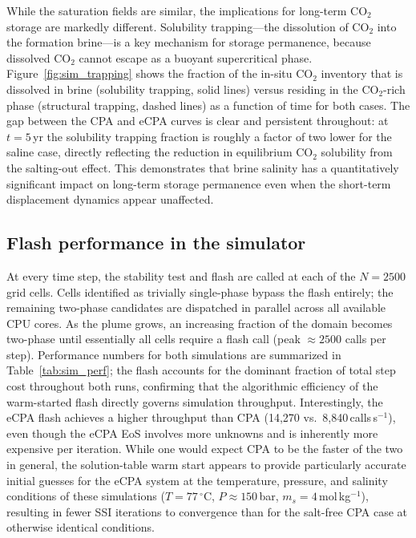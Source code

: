 \documentclass[preprint,12pt,number]{elsarticle}
\begin{document}
While the saturation fields are similar, the implications for long-term CO$_2$ storage
are markedly different.
Solubility trapping---the dissolution of CO$_2$ into the formation brine---is a key
mechanism for storage permanence, because dissolved CO$_2$ cannot escape as a
buoyant supercritical phase.
Figure~\ref{fig:sim_trapping} shows the fraction of the in-situ CO$_2$ inventory that
is dissolved in brine (solubility trapping, solid lines) versus residing in the
CO$_2$-rich phase (structural trapping, dashed lines) as a function of time for both
cases.
The gap between the CPA and eCPA curves is clear and persistent throughout: at $t = 5$\,yr
the solubility trapping fraction is roughly a factor of two lower for the saline case,
directly reflecting the reduction in equilibrium CO$_2$ solubility from the salting-out
effect.
This demonstrates that brine salinity has a quantitatively significant impact on
long-term storage permanence even when the short-term displacement dynamics appear
unaffected.

\subsection*{Flash performance in the simulator}

At every time step, the stability test and flash are called at each of the $N = 2500$
grid cells.
Cells identified as trivially single-phase bypass the flash entirely; the remaining
two-phase candidates are dispatched in parallel across all available CPU cores.
As the plume grows, an increasing fraction of the domain becomes two-phase until
essentially all cells require a flash call (peak ${\approx}2500$ calls per step).
Performance numbers for both simulations are summarized in Table~\ref{tab:sim_perf};
the flash accounts for the dominant fraction of total step cost throughout both runs,
confirming that the algorithmic efficiency of the warm-started flash directly governs
simulation throughput.
Interestingly, the eCPA flash achieves a higher throughput than CPA (14{,}270 vs.\
8{,}840\,calls\,s$^{-1}$), even though the eCPA EoS involves more unknowns and is
inherently more expensive per iteration.
While one would expect CPA to be the faster of the two in general, the solution-table
warm start appears to provide particularly accurate initial guesses for the eCPA system
at the temperature, pressure, and salinity conditions of these simulations
($T = 77\,^\circ$C, $P \approx 150$\,bar, $m_s = 4$\,mol\,kg$^{-1}$), resulting in
fewer SSI iterations to convergence than for the salt-free CPA case at otherwise
identical conditions.
\end{document}
